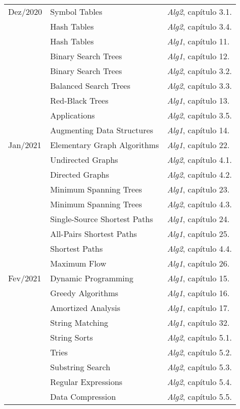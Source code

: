 \documentclass[a4paper]{inzane_syllabus} %
\begin{document}
\begin{center}
\begin{tabularx}{\textwidth}{p{2cm}p{8cm}p{9.5cm}}
\arrayrulecolor{maingray}\hline
Dez/2020 & Symbol Tables               & \emph{Alg2}, capítulo 3.1. \\
         & Hash Tables                 & \emph{Alg2}, capítulo 3.4. \\
         & Hash Tables                 & \emph{Alg1}, capítulo 11.  \\
         & Binary Search Trees         & \emph{Alg1}, capítulo 12.  \\
         & Binary Search Trees         & \emph{Alg2}, capítulo 3.2. \\
         & Balanced Search Trees       & \emph{Alg2}, capítulo 3.3. \\
         & Red-Black Trees             & \emph{Alg1}, capítulo 13.  \\
         & Applications                & \emph{Alg2}, capítulo 3.5. \\
         & Augmenting Data Structures  & \emph{Alg1}, capítulo 14.  \\

\arrayrulecolor{maingray}\hline
Jan/2021 & Elementary Graph Algorithms   & \emph{Alg1}, capítulo 22.  \\
         & Undirected Graphs             & \emph{Alg2}, capítulo 4.1. \\
         & Directed Graphs               & \emph{Alg2}, capítulo 4.2. \\
         & Minimum Spanning Trees        & \emph{Alg1}, capítulo 23.  \\
         & Minimum Spanning Trees        & \emph{Alg2}, capítulo 4.3. \\
         & Single-Source Shortest Paths  & \emph{Alg1}, capítulo 24.  \\
         & All-Pairs Shortest Paths      & \emph{Alg1}, capítulo 25.  \\
         & Shortest Paths                & \emph{Alg2}, capítulo 4.4. \\
         & Maximum Flow                  & \emph{Alg1}, capítulo 26.  \\
         
\arrayrulecolor{maingray}\hline
Fev/2021 & Dynamic Programming  & \emph{Alg1}, capítulo 15.  \\
         & Greedy Algorithms    & \emph{Alg1}, capítulo 16.  \\
         & Amortized Analysis   & \emph{Alg1}, capítulo 17.  \\
         & String Matching      & \emph{Alg1}, capítulo 32. \\
         & String Sorts         & \emph{Alg2}, capítulo 5.1. \\
         & Tries                & \emph{Alg2}, capítulo 5.2. \\
         & Substring Search     & \emph{Alg2}, capítulo 5.3. \\
         & Regular Expressions  & \emph{Alg2}, capítulo 5.4. \\
         & Data Compression     & \emph{Alg2}, capítulo 5.5. \\


\end{tabularx}
\end{center}
\end{document}
